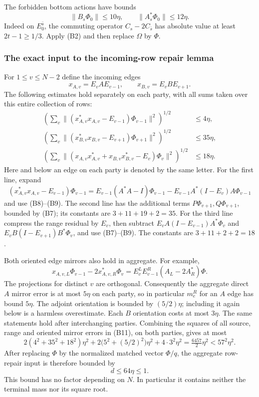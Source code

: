 The forbidden bottom actions have bounds
\[
 \|B_s\Phi_0\|\leq10\eta,\qquad
 \|A_s^*\Phi_0\|\leq12\eta.                    \tag{B10}
\]
Indeed on $E_0^{\bar s}$, the commuting operator
$C_s-2C_{\bar s}$ has absolute value at least $2t-1\geq1/3$.
Apply (B2) and then replace $\Omega$ by $\Phi$.

\subsubsection{The exact input to the incoming-row repair lemma}
For $1\leq v\leq N-2$ define the incoming edges
\[
 x_{A,v}=E_vAE_{v-1},\qquad x_{B,v}=E_vBE_{v+1}.
\]
The following estimates hold separately on each party, with all sums
taken over this entire collection of rows:
\begin{align}
 \left(\sum_v
 \|(x_{A,v}^*x_{A,v}-E_{v-1})\Phi_{v-1}\|^2\right)^{1/2}
 &\leq4\eta,\\
 \left(\sum_v
 \|(x_{B,v}^*x_{B,v}-E_{v+1})\Phi_{v+1}\|^2\right)^{1/2}
 &\leq35\eta,\\
 \left(\sum_v
 \|(x_{A,v}x_{A,v}^*+x_{B,v}x_{B,v}^*-E_v)\Phi_v\|^2\right)^{1/2}
 &\leq18\eta.                                  \tag{B11}
\end{align}
Here and below an edge on each party is denoted by the same letter.
For the first line, expand
\[
 (x_{A,v}^*x_{A,v}-E_{v-1})\Phi_{v-1}
 =E_{v-1}(A^*A-I)\Phi_{v-1}
  -E_{v-1}A^*(I-E_v)A\Phi_{v-1}
\]
and use (B8)--(B9).  The second line has the additional terms
$P\Phi_{v+1},Q\Phi_{v+1}$, bounded by (B7); its constants are
$3+11+19+2=35$.  For the third line compress the range residual by
$E_v$, then subtract
$E_vA(I-E_{v-1})A^*\Phi_v$ and
$E_vB(I-E_{v+1})B^*\Phi_v$, and use (B7)--(B9).
The constants are $3+11+2+2=18$.

Both oriented edge mirrors also hold in aggregate.  For example,
\[
 x_{A,v,L}\Phi_{v-1}-2x_{A,v,R}^*\Phi_v
 =E_v^LE_{v-1}^R(A_L-2A_R^*)\Phi.
\]
The projections for distinct $v$ are orthogonal.  Consequently the
aggregate direct $A$ mirror error is at most $5\eta$ on each party, so in particular $m_e^R$ for an $A$ edge has bound $5\eta$. The adjoint orientation is bounded by $(5/2)\eta$; including it again below is a harmless overestimate.  Each $B$ orientation costs at
most $3\eta$.  The same statements hold after interchanging parties.
Combining the squares of all source, range and oriented mirror errors
in (B11), on both parties, gives at most
\[
 2(4^2+35^2+18^2)\eta^2
 +2\bigl(5^2+(5/2)^2\bigr)\eta^2+4\cdot3^2\eta^2
 =\tfrac{6457}{2}\eta^2<57^2\eta^2.
\]
After replacing $\Phi$ by the normalized matched vector $\Phi/q$, the
aggregate row-repair input is therefore bounded by
\[
 d\leq64\eta\leq1.                             \tag{B12}
\]
This bound has no factor depending on $N$.  In particular it contains
neither the terminal mass nor its square root.


